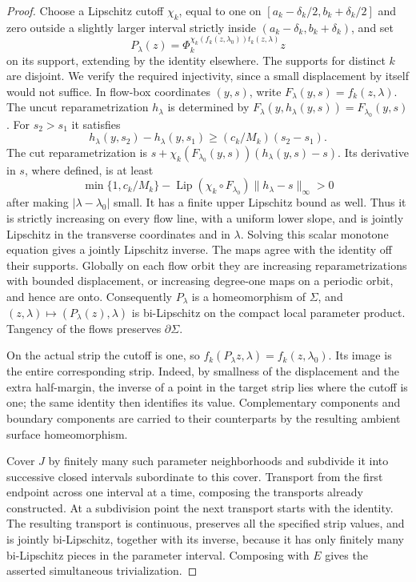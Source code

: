 \documentclass[11pt]{article}
\numberwithin{equation}{section}
\theoremstyle{definition}
\theoremstyle{remark}
\DeclareMathOperator{\Lip}{Lip}
\begin{document}
\begin{proof}
Choose a Lipschitz cutoff $\chi_k$, equal to one on
$[a_k-\delta_k/2,b_k+\delta_k/2]$ and zero outside a slightly
larger interval strictly inside
$(a_k-\delta_k,b_k+\delta_k)$, and set
\[
 P_\lambda(z)=
 \Phi_k^{\chi_k(f_k(z,\lambda_0))t_k(z,\lambda)}z
\]
on its support, extending by the identity elsewhere.  The supports
for distinct $k$ are disjoint.  We verify the required injectivity,
since a small displacement by itself would not suffice.  In flow-box
coordinates $(y,s)$, write $F_\lambda(y,s)=f_k(z,\lambda)$.
The uncut reparametrization $h_\lambda$ is determined by
$F_\lambda(y,h_\lambda(y,s))=F_{\lambda_0}(y,s)$.
For $s_2>s_1$ it satisfies
\[
 h_\lambda(y,s_2)-h_\lambda(y,s_1)
       \geq (c_k/M_k)(s_2-s_1).
\]
The cut reparametrization is
$s+\chi_k(F_{\lambda_0}(y,s))(h_\lambda(y,s)-s)$.
Its derivative in $s$, where defined, is at least
\[
 \min\{1,c_k/M_k\}
 -\Lip(\chi_k\circ F_{\lambda_0})
                      \|h_\lambda-s\|_\infty>0
\]
after making $|\lambda-\lambda_0|$ small.  It has a finite upper
Lipschitz bound as well.  Thus it is strictly increasing on every
flow line, with a uniform lower slope, and is jointly Lipschitz in
the transverse coordinates and in $\lambda$.  Solving this scalar
monotone equation gives a jointly Lipschitz inverse.  The maps agree
with the identity off their supports.  Globally on each flow orbit
they are increasing reparametrizations with bounded displacement,
or increasing degree-one maps on a periodic orbit, and hence are
onto.  Consequently $P_\lambda$ is a homeomorphism of $\Sigma$,
and $(z,\lambda)\mapsto(P_\lambda(z),\lambda)$ is bi-Lipschitz
on the compact local parameter product.  Tangency of the flows
preserves $\partial\Sigma$.

On the actual strip the cutoff is one, so
$f_k(P_\lambda z,\lambda)=f_k(z,\lambda_0)$.
Its image is the entire corresponding strip.  Indeed, by smallness
of the displacement and the extra half-margin, the inverse of a
point in the target strip lies where the cutoff is one; the same
identity then identifies its value.  Complementary components and
boundary components are carried to their counterparts by the
resulting ambient surface homeomorphism.

Cover $J$ by finitely many such parameter neighborhoods and
subdivide it into successive closed intervals subordinate to this
cover.  Transport from the first endpoint across one interval at a
time, composing the transports already constructed.  At a subdivision
point the next transport starts with the identity.  The resulting
transport is continuous, preserves all the specified strip values,
and is jointly bi-Lipschitz, together with its inverse, because it
has only finitely many bi-Lipschitz pieces in the parameter interval.
Composing with $E$ gives the asserted simultaneous trivialization.


\end{proof}
\end{document}
